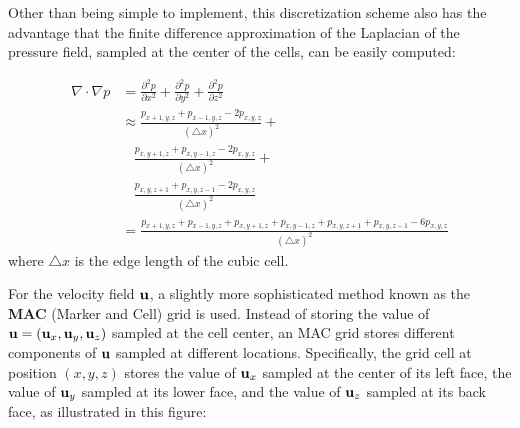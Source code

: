 Other than being simple to implement, this discretization scheme also has the advantage that the finite difference approximation of the Laplacian of the pressure field, sampled at the center of the cells, can be easily computed:

\begin{equation}
    \begin{aligned}
        \nabla \cdot \nabla p 
        &= 
        \frac{\partial ^2 p}{\partial x^2}+
        \frac{\partial ^2 p}{\partial y^2}+
        \frac{\partial ^2 p}{\partial z^2} \\
        &\approx 
        \frac{p_{x+1,y,z}+p_{x-1,y,z}-2p_{x,y,z}}{(\triangle x)^2}+ \\
        &~~~~\frac{p_{x,y+1,z}+p_{x,y-1,z}-2p_{x,y,z}}{(\triangle x)^2}+ \\
        &~~~~\frac{p_{x,y,z+1}+p_{x,y,z-1}-2p_{x,y,z}}{(\triangle x)^2}\\
        &= \frac{p_{x+1,y,z}+p_{x-1,y,z}+p_{x,y+1,z}+p_{x,y-1,z}+p_{x,y,z+1}+p_{x,y,z-1}-6p_{x,y,z}}{(\triangle x)^2}
    \end{aligned}
    \label{eqn discrete laplacian pressure}
\end{equation}
where $\triangle x$ is the edge length of the cubic cell. 


For the velocity field $\textbf{u}$, a slightly more sophisticated method known as the \textbf{MAC} (Marker and Cell) grid is used. Instead of storing the value of $\textbf{u} = (\textbf{u}_x,\textbf{u}_y,\textbf{u}_z)$ sampled at the cell center, an MAC grid stores different components of $\textbf{u}$ sampled at different locations. Specifically, the grid cell at position $(x,y,z)$ stores the value of $\textbf{u}_x$ sampled at the center of its left face, the value of $\textbf{u}_y$ sampled at its lower face, and the value of $\textbf{u}_z$ sampled at its back face, as illustrated in this figure:

